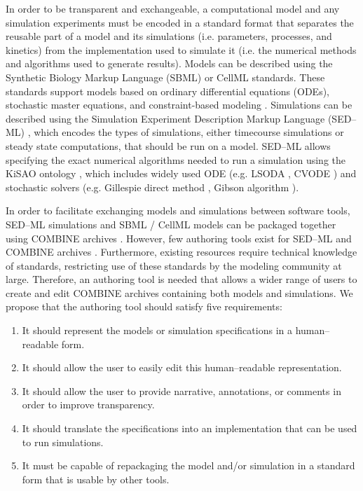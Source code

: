 \documentclass[10pt,letterpaper]{article}
\begin{document}
In order to be transparent and exchangeable, a computational model and any simulation experiments must be encoded in a standard format that separates the reusable part of a model and its simulations (i.e. parameters, processes, and kinetics) from the implementation used to simulate it (i.e. the numerical methods and algorithms used to generate results). Models can be described using the Synthetic Biology Markup Language (SBML) \cite{hucka2003systems} or CellML \cite{cuellar2003overview} standards. These standards support models based on ordinary differential equations (ODEs), stochastic master equations, and constraint-based modeling \cite{sbmlfbc}. Simulations can be described using the Simulation Experiment Description Markup Language (SED--ML) \cite{waltemath2011reproducible}, which encodes the types of simulations, either timecourse simulations or steady state computations, that should be run on a model. SED--ML allows specifying the exact numerical algorithms needed to run a simulation using the KiSAO ontology \cite{courtot2011controlled}, which includes widely used ODE (e.g. LSODA \cite{petzold1989computing}, CVODE \cite{cohen1996cvode}) and stochastic solvers (e.g. Gillespie direct method \cite{gillespie1977exact}, Gibson algorithm \cite{gibson2000efficient}).


In order to facilitate exchanging models and simulations between software tools, SED--ML simulations and SBML / CellML models can be packaged together using COMBINE archives \cite{bergmann2014combine}. However, few authoring tools exist for SED--ML and COMBINE archives \cite{bergmann2017sed,scharm2014combinearchiveweb}. Furthermore, existing resources require technical knowledge of standards, restricting use of these standards by the modeling community at large. Therefore, an authoring tool is needed that allows a wider range of users to create and edit COMBINE archives containing both models and simulations. We propose that the authoring tool should satisfy five requirements:

\begin{enumerate}
\item It should represent the models or simulation specifications in a human--readable form.
\item It should allow the user to easily edit this human--readable representation.
\item It should allow the user to provide narrative, annotations, or comments in order to improve transparency.
\item It should translate the specifications into an implementation that can be used to run simulations.
\item It must be capable of repackaging the model and/or simulation in a standard form that is usable by other tools.
\end{enumerate}
\end{document}
